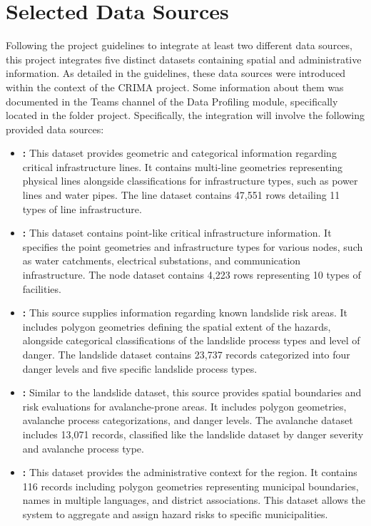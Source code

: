 
\section{Selected Data Sources} \label{data}

Following the project guidelines to integrate at least two different data sources, this project integrates five distinct datasets containing spatial and administrative information. As detailed in the guidelines, these data sources were introduced within the context of the CRIMA project. Some information about them was documented in the Teams channel of the Data Profiling module, specifically located in the folder  project. Specifically, the integration will involve the following provided data sources:
\begin{itemize}
  \item \textbf{:} This dataset provides geometric and categorical information regarding critical infrastructure lines. It contains multi-line geometries representing physical lines alongside classifications for infrastructure types, such as power lines and water pipes. The line dataset contains 47,551 rows detailing 11 types of line infrastructure.
  \item \textbf{:} This dataset contains point-like critical infrastructure information. It specifies the point geometries and infrastructure types for various nodes, such as water catchments, electrical substations, and communication infrastructure. The node dataset contains 4,223 rows representing 10 types of facilities.
  \item \textbf{:} This source supplies information regarding known landslide risk areas. It includes polygon geometries defining the spatial extent of the hazards, alongside categorical classifications of the landslide process types and level of danger. The landslide dataset contains 23,737 records categorized into four danger levels and five specific landslide process types.
  \item \textbf{:} Similar to the landslide dataset, this source provides spatial boundaries and risk evaluations for avalanche-prone areas. It includes polygon geometries, avalanche process categorizations, and danger levels. The avalanche dataset includes 13,071 records, classified like the landslide dataset by danger severity and avalanche process type.
  \item \textbf{:} This dataset provides the administrative context for the region. It contains 116 records including polygon geometries representing municipal boundaries, names in multiple languages, and district associations. This dataset allows the system to aggregate and assign hazard risks to specific municipalities.
\end{itemize}

